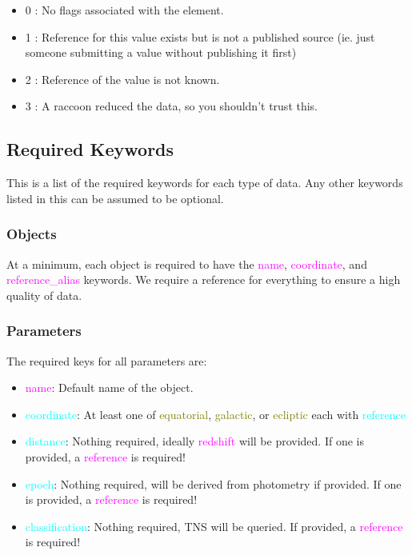 \documentclass[tighten]{aastex631}
\newcommand{\property}[1]{\textcolor{cyan}{#1}}
\newcommand{\subproperty}[1]{\textcolor{olive}{#1}}
\newcommand{\keyword}[1]{\textcolor{magenta}{#1}}
\begin{document}
\begin{itemize}
  \renewcommand{\labelitemi}{} %
    \item 0 : No flags associated with the element.
    \item 1 : Reference for this value exists but is not a published source (ie. just someone submitting a value without publishing it first)
    \item 2 : Reference of the value is not known.
    \item 3 : A raccoon reduced the data, so you shouldn't trust this.
\end{itemize}

\subsection{Required Keywords} \label{sec:required}
This is a list of the required keywords for each type of data. Any other keywords listed in this can be assumed to be optional.

\subsubsection{Objects} \label{subsec:object_requirements}
At a minimum, each object is required to have the \keyword{name}, \keyword{coordinate}, and \keyword{reference\_alias} keywords. We require a reference for everything to ensure a high quality of data.

\subsubsection{Parameters} \label{subsec:param_requirements}
The required keys for all parameters are:
\begin{itemize}
    \item \keyword{name}: Default name of the object.
    \item \property{coordinate}: At least one of \subproperty{equatorial}, \subproperty{galactic}, or \subproperty{ecliptic} each with \property{reference}
    \item \property{distance}: Nothing required, ideally \keyword{redshift} will be provided. If one is provided, a \keyword{reference} is required!
    \item \property{epoch}: Nothing required, will be derived from photometry if provided. If one is provided, a \keyword{reference} is required!
    \item \property{classification}: Nothing required, TNS will be queried. If provided, a \keyword{reference} is required!
\end{itemize}
\end{document}
